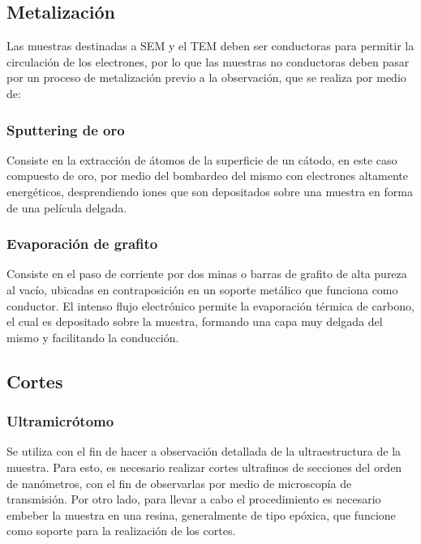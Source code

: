 \documentclass[11pt, letter-size]{article}
\begin{document}
	\subsection{Metalizaci\'on}
	Las muestras destinadas a SEM y el TEM deben ser conductoras para permitir la circulación de los electrones, por lo que las muestras no conductoras deben pasar por un proceso de metalización previo a la observación, que se realiza por medio de:
	\subsubsection{Sputtering de oro}
	Consiste en la extracción de átomos de la superficie de un cátodo, en este caso compuesto de oro, por medio del bombardeo del mismo con electrones altamente energ\'eticos, desprendiendo iones que son depositados sobre una muestra en forma de una pel\'icula delgada.
	
	
	\subsubsection{Evaporaci\'on de grafito}
	Consiste en el paso de corriente por dos minas o barras de grafito de alta pureza al vacío, ubicadas en contraposición en un soporte metálico que funciona como conductor. El intenso flujo electrónico permite la evaporación térmica de carbono, el cual es depositado sobre la muestra, formando una capa muy delgada del mismo y facilitando la conducción. 
	
	\subsection{Cortes}
	\subsubsection{Ultramicr\'otomo}
	Se utiliza con el fin de hacer a observación detallada de la ultraestructura de la muestra. Para esto, es necesario realizar cortes ultrafinos de secciones del orden de nanómetros, con el fin de observarlas por medio de microscopía de transmisión. Por otro lado, para llevar a cabo el procedimiento es necesario embeber la muestra en una resina, generalmente de tipo epóxica, que funcione como soporte para la realización de los cortes.
	 
\end{document}
